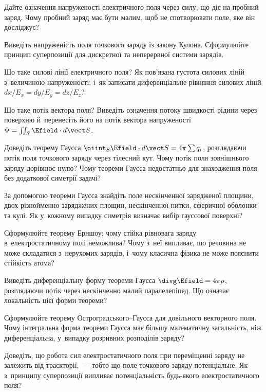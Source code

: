 \begin{Questions}
	\begin{quizlist}
		\item Дайте означення напруженості електричного поля через силу, що діє на пробний
		заряд. Чому пробний заряд має бути малим, щоб не спотворювати поле, яке він
		досліджує?
		\item Виведіть напруженість поля точкового заряду із закону Кулона. Сформулюйте
		принцип суперпозиції для дискретної та неперервної системи зарядів.
		\item Що таке силові лінії електричного поля? Як пов'язана густота силових ліній
		з~величиною напруженості, і~як записати диференціальне рівняння силових ліній
		$dx/E_x = dy/E_y = dz/E_z$?
		\item Що таке потік вектора поля? Виведіть означення потоку швидкості рідини через
		поверхню й~перенесіть його на потік вектора напруженості $\Phi = \iint_S\Efield\cdot
			d\vect S$.
		\item Доведіть теорему Гаусса $\oiint_S\Efield\cdot d\vect S = 4\pi\sum q_i$,
		розглядаючи потік поля точкового заряду через тілесний кут. Чому потік поля зовнішнього
		заряду дорівнює нулю? Чому теореми Гаусса
		недостатньо для знаходження поля без додаткової симетрії задачі?
			\item За допомогою теореми Гаусса знайдіть поле нескінченної зарядженої площини,
			двох різнойменно заряджених площин, нескінченної нитки, сферичної оболонки та кулі. Як
			у~кожному випадку симетрія визначає вибір гауссової поверхні?
		\item Сформулюйте теорему Ерншоу: чому стійка рівновага заряду в~електростатичному
		полі неможлива? Чому з~неї випливає, що речовина не може складатися з~нерухомих
		зарядів, і~чому класична фізика не може пояснити стійкість атома?
		\item Виведіть диференціальну форму теореми Гаусса $\divg\Efield=4\pi\rho$,
		розглядаючи потік через нескінченно малий паралелепіпед. Що означає локальність цієї
		форми теореми?
		\item Сформулюйте теорему Остроградського--Гаусса для довільного векторного поля. Чому
		інтегральна форма теореми Гаусса має більшу математичну загальність, ніж
		диференціальна, у~випадку розривних розподілів заряду?
		\item Доведіть, що робота сил електростатичного поля при переміщенні заряду не
		залежить від траєкторії,~--- тобто що поле точкового заряду потенціальне. Як
		з~принципу суперпозиції випливає потенціальність будь-якого електростатичного поля?

\end{quizlist}
\end{Questions}
